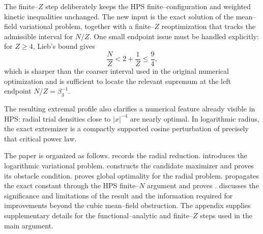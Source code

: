 The finite--$Z$ step deliberately keeps the HPS finite--configuration and weighted kinetic inequalities unchanged.  The new input is the exact solution of the mean--field variational problem, together with a finite--$Z$ reoptimization that tracks the admissible interval for $N/Z$.  One small endpoint issue must be handled explicitly: for $Z\ge4$, Lieb's bound gives
\[
 \frac NZ<2+\frac1Z\le\frac94,
\]
which is sharper than the coarser interval used in the original numerical optimization and is sufficient to locate the relevant supremum at the left endpoint $N/Z=\beta_3^{-1}$.

The resulting extremal profile also clarifies a numerical feature already visible in HPS: radial trial densities close to $|x|^{-4}$ are nearly optimal.  In logarithmic radius, the exact extremizer is a compactly supported cosine perturbation of precisely that critical power law.

The paper is organized as follows.   records the radial reduction.   introduces the logarithmic variational problem.   constructs the candidate maximizer and proves its obstacle condition.   proves global optimality for the radial problem.   propagates the exact constant through the HPS finite--$N$ argument and proves .   discusses the significance and limitations of the result and the information required for improvements beyond the cubic mean--field obstruction.  The appendix supplies supplementary details for the functional--analytic and finite--$Z$ steps used in the main argument.
